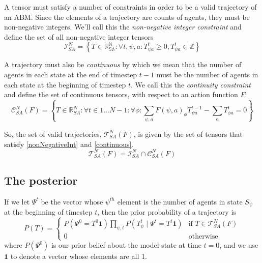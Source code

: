 \documentclass{article}
\begin{document}
A tensor must satisfy a number of constraints in order to be a valid trajectory of an ABM. Since the elements of a trajectory are counts of agents, they must be non-negative integers. We'll call this the \textit{non-negative integer constraint} and define the set of all non-negative integer tensors
\begin{equation}
\mathcal{I}^N_{SA} = \left\{ T \in \mathbb{R^N_{SA}}: \forall t,\psi, a: T^t_{\psi a} \ge 0, T^t_{\psi a} \in \mathbb{Z}\right\}
\label{nonNegativeInt}
\end{equation}

A trajectory must also be \textit{continuous} by which we mean that the number of agents in each state at the end of timestep $t-1$ must be the number of agents in each state at the beginning of timestep $t$. We call this the \textit{continuity constraint} and define the set of continuous tensors, with respect to an action function $F$:
\begin{equation}
\mathcal{C}^N_{SA}(F) = \left\{T\in\mathbb{R}^N_{SA}:  \forall t \in 1 ... N-1:\forall \phi: \sum_{\psi, a} F(\psi, a)_\phi T^{t-1}_{\psi a} - \sum_a T^t_{\phi a} = 0\right\}
\label{continuous}
\end{equation}

So, the set of valid trajectories, $\mathcal{T}^N_{SA}(F)$, is given by the set of tensors that satisfy \eqref{nonNegativeInt} and \eqref{continuous}.
\begin{equation}
\mathcal{T}^N_{SA}(F) = \mathcal{I}^N_{SA} \cap \mathcal{C}^N_{SA}(F)
\end{equation}


\subsection{The posterior}

If we let $\Psi^t$ be the vector whose $\psi^{th}$ element is the number of agents in state $S_\psi$ at the beginning of timestep $t$, then the prior probability of a trajectory is
\[
P(T) =
\begin{cases}
P\left(\Psi^0 = T^0 \mathbf{1} \right) \prod_{\psi, t} P\left(T^t_{\psi} \mid \Psi^t = T^t \mathbf{1}\right) & \text{if } T \in \mathcal{T}^N_{SA}(F) \\
0 & \text{otherwise}
\end{cases}
\]
where $P(\Psi^0)$ is our prior belief about the model state at time $t=0$, and we use $\mathbf{1}$ to denote a vector whose elements are all 1.
\end{document}
